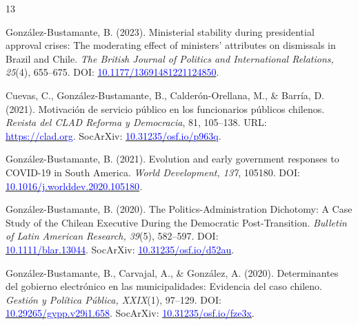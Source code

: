 \begin{publications}
\begin{benumerate}{13}
\item{González-Bustamante, B. (2023). Ministerial stability during presidential approval crises: The moderating effect of ministers' attributes on dismissals in Brazil and Chile. {\itshape The British Journal of Politics and International Relations, 25}(4), 655--675. DOI: \href{https://doi.org/10.1177/13691481221124850}{\textcolor{blue}{10.1177/13691481221124850}}.}\vspace{1mm}

\item{Cuevas, C., González-Bustamante, B., Calderón-Orellana, M., \& Barría, D. (2021). Motivación de servicio público en los funcionarios públicos chilenos. {\itshape Revista del CLAD Reforma y Democracia}, 81, 105--138. URL: \\ \href{https://revista.clad.org/ryd/en/issue/view/50}{\textcolor{blue}{https://clad.org}}. SocArXiv: \href{https://doi.org/10.31235/osf.io/p963q}{\textcolor{blue}{10.31235/osf.io/p963q}}.}\vspace{1mm}

\item{González-Bustamante, B. (2021). Evolution and early government responses to COVID-19 in South America. {\itshape World Development, 137}, 105180. DOI: \href{https://doi.org/10.1016/j.worlddev.2020.105180}{\textcolor{blue}{10.1016/j.worlddev.2020.105180}}.}\vspace{1mm}

\item{González-Bustamante, B. (2020). The Politics-Administration Dichotomy: A Case Study of the Chilean Executive During the Democratic Post-Transition. {\itshape Bulletin of Latin American Research, 39}(5), 582--597. DOI: \\ \href{https://doi.org/10.1111/blar.13044}{\textcolor{blue}{10.1111/blar.13044}}. SocArXiv: \href{https://doi.org/10.31235/osf.io/d52au}{\textcolor{blue}{10.31235/osf.io/d52au}}.}\vspace{1mm}

\item{González-Bustamante, B., Carvajal, A., \& González, A. (2020). Determinantes del gobierno electrónico en las municipalidades: Evidencia del caso chileno. {\itshape Gestión y Política Pública, XXIX}(1), 97--129. DOI: \\ \href{http://dx.doi.org/10.29265/gypp.v29i1.658}{\textcolor{blue}{10.29265/gypp.v29i1.658}}. SocArXiv: \href{https://doi.org/10.31235/osf.io/fze3x}{\textcolor{blue}{10.31235/osf.io/fze3x}}.} \vspace{1mm}


\end{benumerate}
\end{publications}
